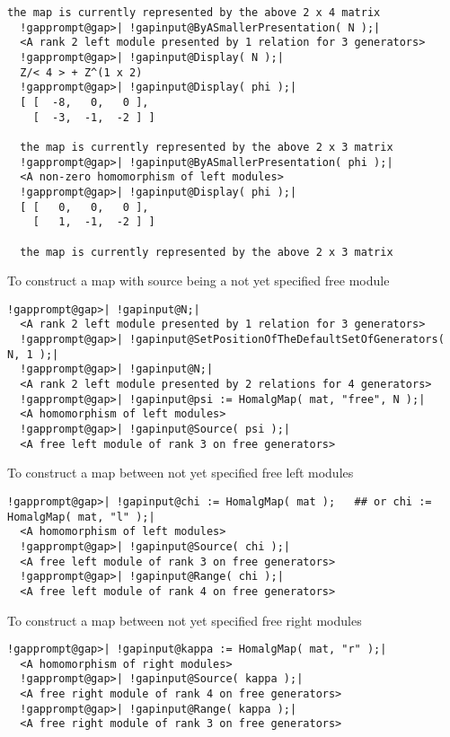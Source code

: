 \documentclass[a4paper,11pt]{report}
\begin{document}
{{{\begin{Verbatim}[commandchars=!@|,fontsize=\small,frame=single,label=Example]
  the map is currently represented by the above 2 x 4 matrix
  !gapprompt@gap>| !gapinput@ByASmallerPresentation( N );|
  <A rank 2 left module presented by 1 relation for 3 generators>
  !gapprompt@gap>| !gapinput@Display( N );|
  Z/< 4 > + Z^(1 x 2)
  !gapprompt@gap>| !gapinput@Display( phi );|
  [ [  -8,   0,   0 ],
    [  -3,  -1,  -2 ] ]
  
  the map is currently represented by the above 2 x 3 matrix
  !gapprompt@gap>| !gapinput@ByASmallerPresentation( phi );|
  <A non-zero homomorphism of left modules>
  !gapprompt@gap>| !gapinput@Display( phi );|
  [ [   0,   0,   0 ],
    [   1,  -1,  -2 ] ]
  
  the map is currently represented by the above 2 x 3 matrix
\end{Verbatim}
 To construct a map with source being a not yet specified free module 
\begin{Verbatim}[commandchars=!@|,fontsize=\small,frame=single,label=Example]
  !gapprompt@gap>| !gapinput@N;|
  <A rank 2 left module presented by 1 relation for 3 generators>
  !gapprompt@gap>| !gapinput@SetPositionOfTheDefaultSetOfGenerators( N, 1 );|
  !gapprompt@gap>| !gapinput@N;|
  <A rank 2 left module presented by 2 relations for 4 generators>
  !gapprompt@gap>| !gapinput@psi := HomalgMap( mat, "free", N );|
  <A homomorphism of left modules>
  !gapprompt@gap>| !gapinput@Source( psi );|
  <A free left module of rank 3 on free generators>
\end{Verbatim}
 To construct a map between not yet specified free left modules 
\begin{Verbatim}[commandchars=!@|,fontsize=\small,frame=single,label=Example]
  !gapprompt@gap>| !gapinput@chi := HomalgMap( mat );	## or chi := HomalgMap( mat, "l" );|
  <A homomorphism of left modules>
  !gapprompt@gap>| !gapinput@Source( chi );|
  <A free left module of rank 3 on free generators>
  !gapprompt@gap>| !gapinput@Range( chi );|
  <A free left module of rank 4 on free generators>
\end{Verbatim}
 To construct a map between not yet specified free right modules 
\begin{Verbatim}[commandchars=!@|,fontsize=\small,frame=single,label=Example]
  !gapprompt@gap>| !gapinput@kappa := HomalgMap( mat, "r" );|
  <A homomorphism of right modules>
  !gapprompt@gap>| !gapinput@Source( kappa );|
  <A free right module of rank 4 on free generators>
  !gapprompt@gap>| !gapinput@Range( kappa );|
  <A free right module of rank 3 on free generators>
\end{Verbatim}
 }

}}
\end{document}
